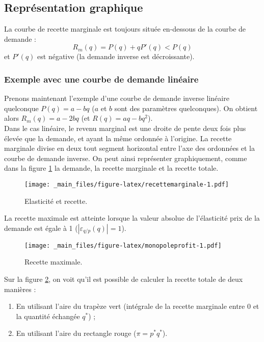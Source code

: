 \documentclass[
]{book}
\providecommand{\tightlist}{%
  \setlength{\itemsep}{0pt}\setlength{\parskip}{0pt}}
\theoremstyle{definition}
\theoremstyle{definition}
\theoremstyle{definition}
\theoremstyle{definition}
\theoremstyle{remark}
\begin{document}
\hypertarget{repruxe9sentation-graphique}{%
\subsection{Représentation graphique}\label{repruxe9sentation-graphique}}

La courbe de recette marginale est toujours située en-dessous de la courbe de demande :
\[
R_m(q) = P(q) + qP'(q) < P(q)
\]
et \(P'(q)\) est négative (la demande inverse est décroissante).

\hypertarget{exemple-avec-une-courbe-de-demande-linuxe9aire}{%
\subsubsection{Exemple avec une courbe de demande linéaire}\label{exemple-avec-une-courbe-de-demande-linuxe9aire}}

Prenons maintenant l'exemple d'une courbe de demande inverse linéaire quelconque \(P(q) = a-bq\) (\(a\) et \(b\) sont des paramètres quelconques).
On obtient alors \(R_m(q) = a-2bq\) (et \(R(q) = aq-bq^2\)).\\
Dans le cas linéaire, le revenu marginal est une droite de pente deux fois plus élevée que la demande, et ayant la même ordonnée à l'origine.
La recette marginale divise en deux tout segment horizontal entre l'axe des ordonnées et la courbe de demande inverse.
On peut ainsi représenter graphiquement, comme dans la figure \ref{fig:recettemarginale} la demande, la recette marginale et la recette totale.

\begin{figure}
\centering
\texttt{[image: \_main\_files/figure-latex/recettemarginale-1.pdf]}
\caption{\label{fig:recettemarginale}Elasticité et recette.}
\end{figure}

La recette maximale est atteinte lorsque la valeur absolue de l'élasticité prix de la demande est égale à 1 (\(|\varepsilon_{q/p}(q)|=1\)).

\begin{figure}
\centering
\texttt{[image: \_main\_files/figure-latex/monopoleprofit-1.pdf]}
\caption{\label{fig:monopoleprofit}Recette maximale.}
\end{figure}

Sur la figure \ref{fig:monopoleprofit}, on voit qu'il est possible de calculer la recette totale de deux manières :

\begin{enumerate}
\def\labelenumi{\arabic{enumi}.}
\tightlist
\item
  En utilisant l'aire du trapèze vert (intégrale de la recette marginale entre 0 et la quantité échangée \(q^*\)) ;
\item
  En utilisant l'aire du rectangle rouge (\(\pi=p^* q^*\)).
\end{enumerate}
\end{document}
